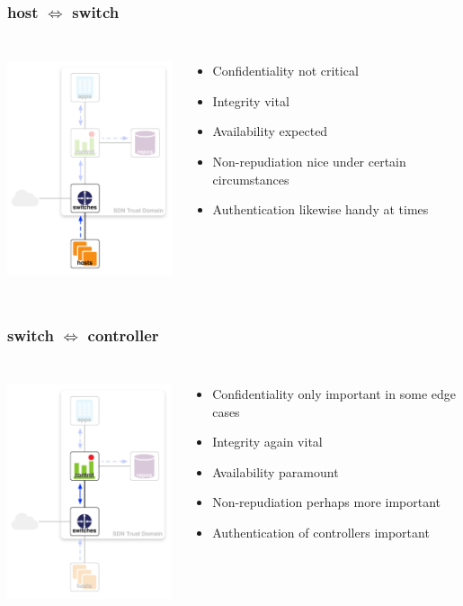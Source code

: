 \documentclass[t,handout]{beamer}
\begin{document}
\begin{frame}
\frametitle{host $\Longleftrightarrow$ switch}
\begin{columns}[T]
\includegraphics[height=2.75in]{ra-h-sw}
\begin{itemize}
\item {\color{orange} Confidentiality not critical}
\item {\color{red} Integrity vital}
\item {\color{orange} Availability expected} 
\item {\color{green} Non-repudiation nice under certain circumstances}
\item {\color{green} Authentication likewise handy at times}
\end{itemize}
\end{columns}
\end{frame}

\begin{frame}
\frametitle{switch $\Longleftrightarrow$  controller}
\begin{columns}[T]
\includegraphics[height=2.75in]{ra-sw-c}
\begin{itemize}
\item {\color{orange} Confidentiality only important in some edge cases}
\item {\color{red} Integrity again vital}
\item {\color{red} Availability paramount} 
\item {\color{orange} Non-repudiation perhaps more important}
\item {\color{red} Authentication of controllers important}
\end{itemize}
\end{columns}
\end{frame}
\end{document}
